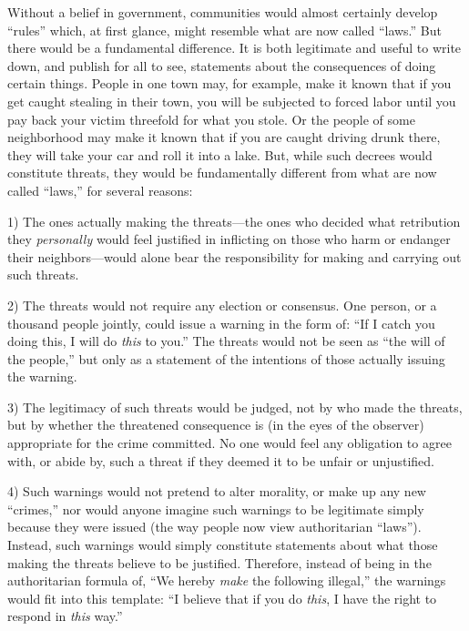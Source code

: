 \documentclass{book}
\begin{document}
Without a belief in government, communities would almost certainly develop \enquote{rules} which, at first glance, might resemble what are now called \enquote{laws.} But there would be a fundamental difference. It is both legitimate and useful to write down, and publish for all to see, statements about the consequences of doing certain things. People in one town may, for example, make it known that if you get caught stealing in their town, you will be subjected to forced labor until you pay back your victim threefold for what you stole. Or the people of some neighborhood may make it known that if you are caught driving drunk there, they will take your car and roll it into a lake. But, while such decrees would constitute threats, they would be fundamentally different from what are now called \enquote{laws,} for several reasons:

1) The ones actually making the threats---the ones who decided what retribution they \emph{personally} would feel justified in inflicting on those who harm or endanger their neighbors---would alone bear the responsibility for making and carrying out such threats.

2) The threats would not require any election or consensus. One person, or a thousand people jointly, could issue a warning in the form of: \enquote{If I catch you doing this, I will do \emph{this} to you.} The threats would not be seen as \enquote{the will of the people,} but only as a statement of the intentions of those actually issuing the warning.

3) The legitimacy of such threats would be judged, not by who made the threats, but by whether the threatened consequence is (in the eyes of the observer) appropriate for the crime committed. No one would feel any obligation to agree with, or abide by, such a threat if they deemed it to be unfair or unjustified.

4) Such warnings would not pretend to alter morality, or make up any new \enquote{crimes,} nor would anyone imagine such warnings to be legitimate simply because they were issued (the way people now view authoritarian \enquote{laws}). Instead, such warnings would simply constitute statements about what those making the threats believe to be justified. Therefore, instead of being in the authoritarian formula of, \enquote{We hereby \emph{make} the following illegal,} the warnings would fit into this template: \enquote{I believe that if you do \emph{this}, I have the right to respond in \emph{this} way.}
\end{document}

